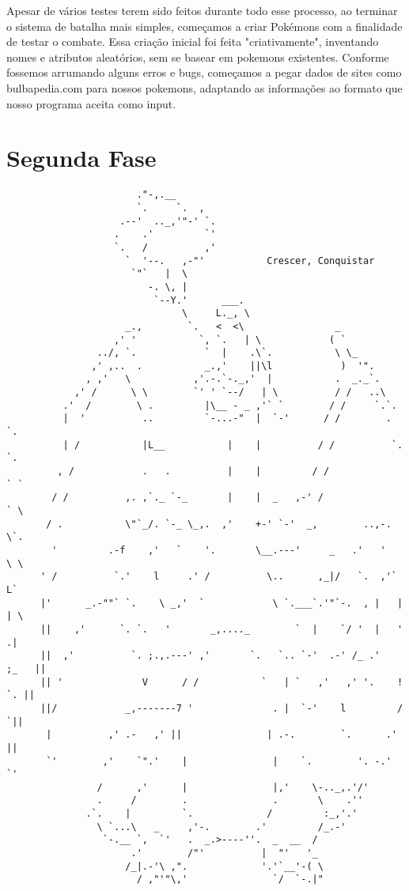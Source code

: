 \documentclass[a4paper]{article}
\begin{document}
    Apesar de vários testes terem sido feitos durante todo esse processo, ao terminar o sistema de batalha mais simples, começamos a criar Pokémons com a
finalidade de testar o combate. Essa criação inicial foi feita "criativamente",
inventando nomes e atributos aleatórios, sem se basear em pokemons existentes.
Conforme fossemos arrumando alguns erros e bugs, começamos a pegar dados de
sites como bulbapedia.com para nossos pokemons, adaptando as informações ao
formato que nosso programa aceita como input.

\newpage
\section{Segunda Fase}

\begin{verbatim}
                       ."-,.__
                       `.     `.  ,
                    .--'  .._,'"-' `.
                   .    .'         `'
                   `.   /          ,'
                     `  '--.   ,-"'           Crescer, Conquistar
                      `"`   |  \
                         -. \, |
                          `--Y.'      ___.
                               \     L._, \
                     _.,        `.   <  <\                _
                   ,' '           `, `.   | \            ( `
                ../, `.            `  |    .\`.           \ \_
               ,' ,..  .           _.,'    ||\l            )  '".
              , ,'   \           ,'.-.`-._,'  |           .  _._`.
            ,' /      \ \        `' ' `--/   | \          / /   ..\
          .'  /        \ .         |\__ - _ ,'` `        / /     `.`.
          |  '          ..         `-...-"  |  `-'      / /        . `.
          | /           |L__           |    |          / /          `. `.
         , /            .   .          |    |         / /             ` `
        / /          ,. ,`._ `-_       |    |  _   ,-' /               ` \
       / .           \"`_/. `-_ \_,.  ,'    +-' `-'  _,        ..,-.    \`.
        '         .-f    ,'   `    '.       \__.---'     _   .'   '     \ \
      ' /          `.'    l     .' /          \..      ,_|/   `.  ,'`     L`
      |'      _.-""` `.    \ _,'  `            \ `.___`.'"`-.  , |   |    | \
      ||    ,'      `. `.   '       _,...._        `  |    `/ '  |   '     .|
      ||  ,'          `. ;.,.---' ,'       `.   `.. `-'  .-' /_ .'    ;_   ||
      || '              V      / /           `   | `   ,'   ,' '.    !  `. ||
      ||/            _,-------7 '              . |  `-'    l         /    `||
       |          ,' .-   ,' ||               | .-.        `.      .'     ||
       `'        ,'    `".'    |               |    `.        '. -.'       `'
                /      ,'      |               |,'    \-.._,.'/'
                .     /        .               .       \    .''
              .`.    |         `.             /         :_,'.'
                \ `...\   _     ,'-.        .'         /_.-'
                 `-.__ `,  `'   .  _.>----''.  _  __  /
                      .'        /"'          |  "'   '_
                     /_|.-'\ ,".             '.'`__'-( \
                       / ,"'"\,'               `/  `-.|"
\end{verbatim}
\end{document}
